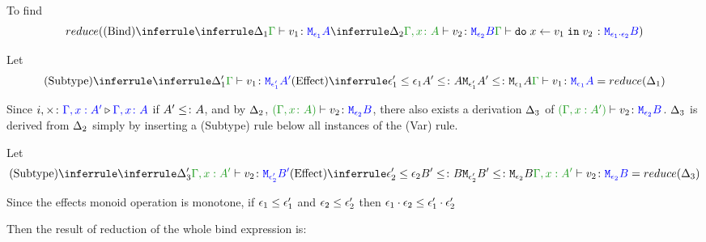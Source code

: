 \documentclass{report}
\begin{document}
            To find
            \begin{equation}
                \reduce(
                    \ntreeruleI{Bind}{
                        \treeruleI{
                            \D_1
                        }{
                            \gtyperelation{v_1}{\M{\e_1}{A}}
                        }
                        }{
                        \treeruleI{
                            \D_2
                        }{
                            \typerelation{\gax}{v_2}{\M{\e_2}{B}}
                        }
                    } {
                        \gtyperelation{\doin{x}{v_1}{v_2}}{\M{\e_1\dot\e_2}{B}}
                    }
                )
            \end{equation}

            Let \begin{equation}
                \ntreeruleII{Subtype}{
                    \treeruleI{\D'_1}{\gtyperelation{v_1}{\M{\e'_1}{A'}}}
                }{
                    \subeffecttree{\e_1'}{A'}{\e_1}{A}
                }{
                    \gtyperelation{v_1}{\M{\e_1}{A}}
                } = \reduce(\D_1)
            \end{equation}

            Since $i,\times \colon {\color{blue}\Gamma, x: A'} \triangleright {\color {blue} \Gamma, x\colon A}$ if $A' \leq\colon A$, and by $\Delta_2$, $\typerelation{(\gax)}{v_2}{\M{\e_2}{B}}$, there also exists a derivation $\Delta_3$ of $\typerelation{(\G, x: A')}{v_2}{\M{\e_2}{B}}$. $\Delta_3$ is derived from $\Delta_2$ simply by inserting a (Subtype) rule below all instances of the (Var) rule.

            Let \begin{equation}
                \ntreeruleII{Subtype}{
                    \treeruleI{\D'_3}{\typerelation{\G, x: A'}{v_2}{\M{\e'_2}{B'}}}
                }{
                    \subeffecttree{\e_2'}{B'}{\e_2}{B}
                }{
                    \typerelation{\G, x: A'}{v_2}{\M{\e_2}{B}}
                } = \reduce(\D_3)
            \end{equation}
            

            Since the effects monoid operation is monotone, if $\epsilon_1\leq\epsilon_1'$ and $\epsilon_2\leq\epsilon_2'$ then $\epsilon_1\cdot\epsilon_2 \leq \epsilon_1'\cdot\epsilon_2'$
            


            Then the result of reduction of the whole bind expression is:
\end{document}
